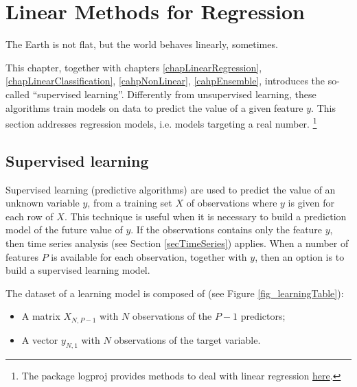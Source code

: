\chapter{Linear Methods for Regression}{The Earth is not flat, but the world behaves linearly, sometimes.} \label{chapLinearRegression}

This chapter, together with chapters \ref{chapLinearRegression}, \ref{chapLinearClassification}, \ref{cahpNonLinear}, \ref{cahpEnsemble}, introduces the so-called “supervised learning”. Differently from unsupervised learning, these algorithms train models on data to predict the value of a given feature $y$. This section addresses regression models, i.e. models targeting a real number. \footnote{The package logproj provides methods to deal with linear regression \href{https://github.com/aletuf93/logproj/blob/master/logproj/M_learningMethod/linear_models.py}{here}.} 

\section{Supervised learning} \label{supervisedLearning}
Supervised learning (predictive algorithms) are used to predict the value of an unknown variable $y$, from a training set $X$ of observations where $y$ is given for each row of $X$. This technique is useful when it is necessary to build a prediction model of the future value of $y$. If the observations contains only the feature $y$, then time series analysis (see Section \ref{secTimeSeries}) applies. When a number of features $P$ is available for each observation, together with $y$, then an option is to build a supervised learning model.

The dataset of a learning model is composed of (see Figure \ref{fig_learningTable}):
\begin{itemize}
    \item A matrix $X_{N,P-1}$ with $N$ observations of the $P-1$ predictors;
    \item A vector $y_{N,1}$ with $N$ observations of the target variable.
\end{itemize}

